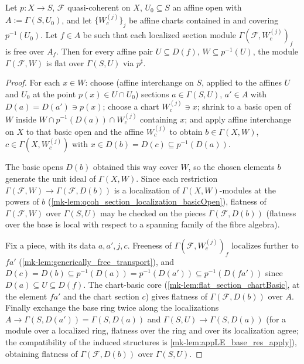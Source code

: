 \begin{lemma}
  \label{mk-lem:flat_section_pair}
  \leanok

  Let \(p : X \to S\), \(\mathcal F\) quasi-coherent on \(X\),
  \(U_0 \subseteq S\) an affine open with \(A := \Gamma(S, U_0)\), and let
  \(\{W_c^{(j)}\}_{j}\) be affine charts contained in and covering
  \(p^{-1}(U_0)\). Let \(f \in A\) be such that each localized section
  module \(\Gamma(\mathcal F, W_c^{(j)})_f\) is free over \(A_f\). Then for
  every affine pair \(U \subseteq D(f)\), \(W \subseteq p^{-1}(U)\), the
  module \(\Gamma(\mathcal F, W)\) is flat over \(\Gamma(S, U)\) via
  \(p^\sharp\).
\end{lemma}
\begin{proof}
  \leanok
  For each \(x \in W\): choose (affine interchange on \(S\), applied to the
  affines \(U\) and \(U_0\) at the point \(p(x) \in U \cap U_0\)) sections
  \(a \in \Gamma(S, U)\), \(a' \in A\) with
  \(D(a) = D(a') \ni p(x)\); choose a chart \(W_c^{(j)} \ni x\); shrink to a
  basic open of \(W\) inside \(W \cap p^{-1}(D(a)) \cap W_c^{(j)}\)
  containing \(x\); and apply affine interchange on \(X\) to that basic open
  and the affine \(W_c^{(j)}\) to obtain \(b \in \Gamma(X, W)\),
  \(c \in \Gamma(X, W_c^{(j)})\) with
  \(x \in D(b) = D(c) \subseteq p^{-1}(D(a))\).

  The basic opens \(D(b)\) obtained this way cover \(W\), so the chosen
  elements \(b\) generate the unit ideal of \(\Gamma(X, W)\). Since each
  restriction \(\Gamma(\mathcal F, W) \to \Gamma(\mathcal F, D(b))\) is a
  localization of \(\Gamma(X, W)\)-modules at the powers of \(b\)
  (\ref{mk-lem:qcoh_section_localization_basicOpen}), flatness of
  \(\Gamma(\mathcal F, W)\) over \(\Gamma(S, U)\) may be checked on the
  pieces \(\Gamma(\mathcal F, D(b))\) (flatness over the base is local with
  respect to a spanning family of the fibre algebra).

  Fix a piece, with its data \(a, a', j, c\). Freeness of
  \(\Gamma(\mathcal F, W_c^{(j)})_f\) localizes further to
  \(f a'\) (\ref{mk-lem:generically_free_transport}), and
  \(D(c) = D(b) \subseteq p^{-1}(D(a)) = p^{-1}(D(a'))
  \subseteq p^{-1}(D(f a'))\) since \(D(a) \subseteq U \subseteq D(f)\).
  The chart-basic core (\ref{mk-lem:flat_section_chartBasic}, at the element
  \(f a'\) and the chart section \(c\)) gives flatness of
  \(\Gamma(\mathcal F, D(b))\) over \(A\). Finally exchange the base ring
  twice along the localizations \(A \to \Gamma(S, D(a')) = \Gamma(S, D(a))\)
  and \(\Gamma(S, U) \to \Gamma(S, D(a))\) (for a module over a localized
  ring, flatness over the ring and over its localization agree; the
  compatibility of the induced structures is
  \ref{mk-lem:appLE_base_res_apply}), obtaining flatness of
  \(\Gamma(\mathcal F, D(b))\) over \(\Gamma(S, U)\).
\end{proof}

